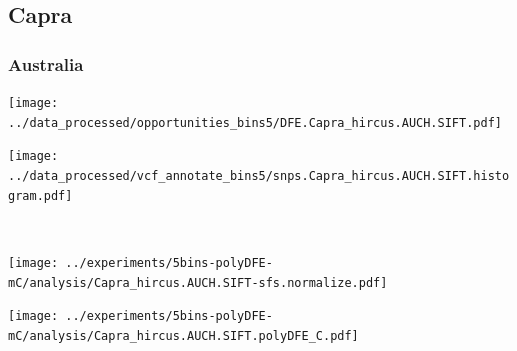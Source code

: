 \subsection{Capra}

\subsubsection{Australia}

\begin{minipage}{0.49\linewidth}
    \texttt{[image: ../data\_processed/opportunities\_bins5/DFE.Capra\_hircus.AUCH.SIFT.pdf]}
\end{minipage}
\begin{minipage}{0.49\linewidth}
    \texttt{[image: ../data\_processed/vcf\_annotate\_bins5/snps.Capra\_hircus.AUCH.SIFT.histogram.pdf]}
\end{minipage}
\\
\begin{minipage}{0.49\linewidth}
    \texttt{[image: ../experiments/5bins-polyDFE-mC/analysis/Capra\_hircus.AUCH.SIFT-sfs.normalize.pdf]}
\end{minipage}
\begin{minipage}{0.4\linewidth}
    \texttt{[image: ../experiments/5bins-polyDFE-mC/analysis/Capra\_hircus.AUCH.SIFT.polyDFE\_C.pdf]}
\end{minipage}

